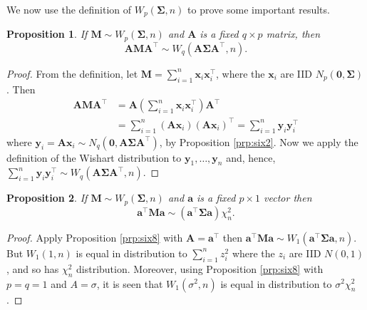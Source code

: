 \documentclass[]{book}
\newtheorem{proposition}{Proposition}[chapter]
\theoremstyle{definition}
\theoremstyle{definition}
\theoremstyle{definition}
\theoremstyle{remark}
\begin{document}
We now use the definition of \(W_p(\boldsymbol \Sigma, n)\) to prove some important
results.

\begin{proposition}
\protect\hypertarget{prp:six8}{}{\label{prp:six8} }If \(\boldsymbol M\sim W_p(\boldsymbol \Sigma,n)\) and \(\boldsymbol A\) is a fixed \(q \times p\) matrix, then
\[ \boldsymbol A\boldsymbol M\boldsymbol A^\top \sim W_q \left(\boldsymbol A\boldsymbol \Sigma\boldsymbol A^\top, n \right).\]
\end{proposition}

\begin{proof}
{}From the definition, let \(\boldsymbol M= \sum_{i=1}^n \boldsymbol x_i \boldsymbol x_i^\top\), where the \(\boldsymbol x_i\) are
IID \(N_p(\boldsymbol 0,\boldsymbol \Sigma)\). Then
\begin{align*}
\boldsymbol A\boldsymbol M\boldsymbol A^\top &= \boldsymbol A\left(\sum_{i=1}^n \boldsymbol x_i \boldsymbol x_i^\top \right)\boldsymbol A^\top\\
 &= \sum_{i=1}^n (\boldsymbol A\boldsymbol x_i)(\boldsymbol A\boldsymbol x_i)^\top = \sum_{i=1}^n \boldsymbol y_i \boldsymbol y_i^\top
\end{align*}
where \(\boldsymbol y_i = \boldsymbol A\boldsymbol x_i \sim N_q(\boldsymbol 0,\boldsymbol A\boldsymbol \Sigma\boldsymbol A^\top)\), by Proposition \ref{prp:six2}. Now we apply the definition of the Wishart distribution to \(\boldsymbol y_1,\ldots,\boldsymbol y_n\) and, hence, \(\sum_{i=1}^n \boldsymbol y_i \boldsymbol y_i^\top \sim W_q\left(\boldsymbol A\boldsymbol \Sigma\boldsymbol A^\top, n \right)\).
\end{proof}

\begin{proposition}
\protect\hypertarget{prp:six9}{}{\label{prp:six9} }If \(\boldsymbol M\sim W_p(\boldsymbol \Sigma,n)\) and \(\boldsymbol a\) is a fixed \(p \times 1\) vector then
\[ \boldsymbol a^\top \boldsymbol M\boldsymbol a\sim \left(\boldsymbol a^\top \boldsymbol \Sigma\boldsymbol a\right)\chi_n^2.\]
\end{proposition}

\begin{proof}
{}Apply Proposition \ref{prp:six8} with \(\boldsymbol A= \boldsymbol a^\top\) then \(\boldsymbol a^\top \boldsymbol M\boldsymbol a\sim W_1( \boldsymbol a^\top \boldsymbol \Sigma\boldsymbol a, n)\). But \(W_1(1,n)\) is equal in distribution to \(\sum_{i=1}^n z_i^2\) where the \(z_i\) are IID \(N(0,1)\), and so has \(\chi_n^2\) distribution. Moreover, using Proposition \ref{prp:six8} with \(p=q=1\) and \(A=\sigma\), it is seen that \(W_1(\sigma^2,n)\) is equal in distribution to \(\sigma^2 \chi_n^2\).
\end{proof}
\end{document}
